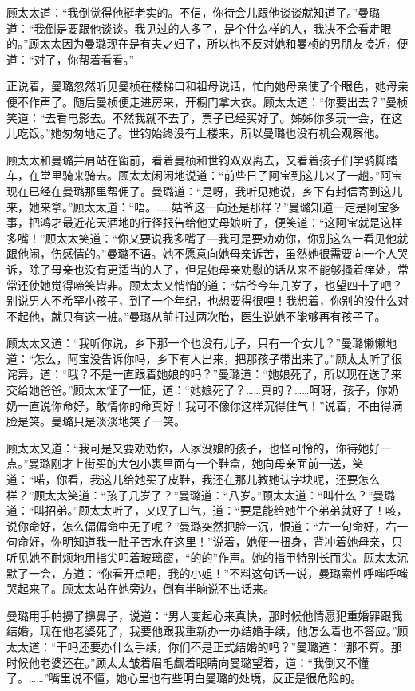 \par 顾太太道：“我倒觉得他挺老实的。不信，你待会儿跟他谈谈就知道了。”曼璐道：“我倒是要跟他谈谈。我见过的人多了，是个什么样的人，我决不会看走眼的。”顾太太因为曼璐现在是有夫之妇了，所以也不反对她和曼桢的男朋友接近，便道：“对了，你帮着看看。”
\par 正说着，曼璐忽然听见曼桢在楼梯口和祖母说话，忙向她母亲使了个眼色，她母亲便不作声了。随后曼桢便走进房来，开橱门拿大衣。顾太太道：“你要出去？”曼桢笑道：“去看电影去。不然我就不去了，票子已经买好了。姊姊你多玩一会，在这儿吃饭。”她匆匆地走了。世钧始终没有上楼来，所以曼璐也没有机会观察他。
\par 顾太太和曼璐并肩站在窗前，看着曼桢和世钧双双离去，又看着孩子们学骑脚踏车，在堂里骑来骑去。顾太太闲闲地说道：“前些日子阿宝到这儿来了一趟。”阿宝现在已经在曼璐那里帮佣了。曼璐道：“是呀，我听见她说，乡下有封信寄到这儿来，她来拿。”顾太太道：“唔。……姑爷这一向还是那样？”曼璐知道一定是阿宝多事，把鸿才最近花天酒地的行径报告给他丈母娘听了，便笑道：“这阿宝就是这样多嘴！”顾太太笑道：“你又要说我多嘴了—我可是要劝劝你，你别这么一看见他就跟他闹，伤感情的。”曼璐不语。她不愿意向她母亲诉苦，虽然她很需要向一个人哭诉，除了母亲也没有更适当的人了，但是她母亲劝慰的话从来不能够搔着痒处，常常还使她觉得啼笑皆非。顾太太又悄悄的道：“姑爷今年几岁了，也望四十了吧？别说男人不希罕小孩子，到了一个年纪，也想要得很哩！我想着，你别的没什么对不起他，就只有这一桩。”曼璐从前打过两次胎，医生说她不能够再有孩子了。
\par 顾太太又道：“我听你说，乡下那一个也没有儿子，只有一个女儿？”曼璐懒懒地道：“怎么，阿宝没告诉你吗，乡下有人出来，把那孩子带出来了。”顾太太听了很诧异，道：“哦？不是一直跟着她娘的吗？”曼璐道：“她娘死了，所以现在送了来交给她爸爸。”顾太太怔了一怔，道：“她娘死了？……真的？……呵呀，孩子，你奶奶一直说你命好，敢情你的命真好！我可不像你这样沉得住气！”说着，不由得满脸是笑。曼璐只是淡淡地笑了一笑。
\par 顾太太又道：“我可是又要劝劝你，人家没娘的孩子，也怪可怜的，你待她好一点。”曼璐刚才上街买的大包小裹里面有一个鞋盒，她向母亲面前一送，笑道：“喏，你看，我这儿给她买了皮鞋，我还在那儿教她认字块呢，还要怎么样？”顾太太笑道：“孩子几岁了？”曼璐道：“八岁。”顾太太道：“叫什么？”曼璐道：“叫招弟。”顾太太听了，又叹了口气，道：“要是能给她生个弟弟就好了！咳，说你命好，怎么偏偏命中无子呢？”曼璐突然把脸一沉，恨道：“左一句命好，右一句命好，你明知道我一肚子苦水在这里！”说着，她便一扭身，背冲着她母亲，只听见她不耐烦地用指尖叩着玻璃窗，“的的”作声。她的指甲特别长而尖。顾太太沉默了一会，方道：“你看开点吧，我的小姐！”不料这句话一说，曼璐索性呼嗤呼嗤哭起来了。顾太太站在她旁边，倒有半晌说不出话来。
\par 曼璐用手帕擤了擤鼻子，说道：“男人变起心来真快，那时候他情愿犯重婚罪跟我结婚，现在他老婆死了，我要他跟我重新办一办结婚手续，他怎么着也不答应。”顾太太道：“干吗还要办什么手续，你们不是正式结婚的吗？”曼璐道：“那不算。那时候他老婆还在。”顾太太皱着眉毛觑着眼睛向曼璐望着，道：“我倒又不懂了。……”嘴里说不懂，她心里也有些明白曼璐的处境，反正是很危险的。
